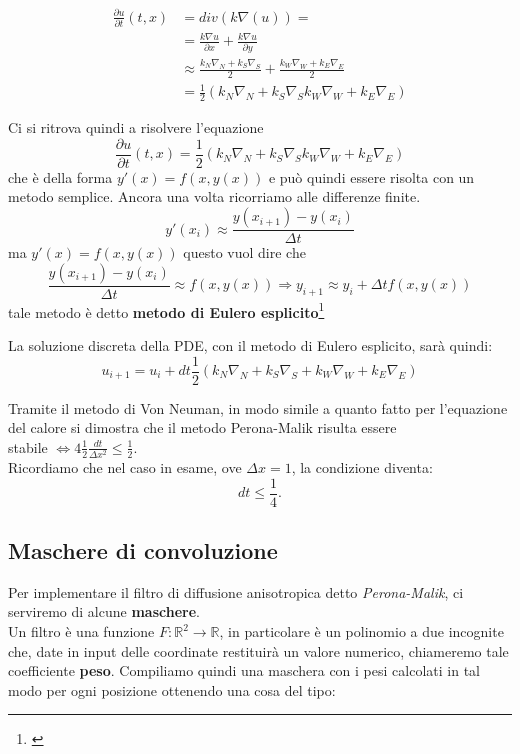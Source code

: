 \begin{align*}
    \frac{\partial u}{\partial t}(t,x)&=div(k\nabla(u))=\\
    &=\frac{k\nabla u}{\partial x} +\frac{k\nabla u}{\partial y}\\
    &\approx\frac{k_N\nabla_N + k_S\nabla_S}{2} +\frac{k_W\nabla_W + k_E\nabla_E}{2}\\
    &=\frac{1}{2}(k_N\nabla_N + k_S\nabla_S k_W\nabla_W + k_E\nabla_E) 
\end{align*}


Ci si ritrova quindi a risolvere l'equazione 
$$
\frac{\partial u}{\partial t}(t,x)=\frac{1}{2}(k_N\nabla_N + k_S\nabla_S k_W\nabla_W + k_E\nabla_E) 
$$
che è della forma $y'(x)=f(x,y(x))$ e può quindi essere risolta con un metodo semplice.
Ancora una volta ricorriamo alle differenze finite.
$$
y'(x_i)\approx \frac{y(x_{i+1})-y(x_{i})}{\Delta t} 
$$
ma $y'(x)=f(x,y(x))$ questo vuol dire che
$$
\frac{y(x_{i+1})-y(x_{i})}{\Delta t}\approx f(x,y(x)) \Rightarrow y_{i+1} \approx y_{i} + \Delta t f(x,y(x))
$$
tale metodo è detto \textbf{metodo di Eulero esplicito}\footnote{\cite{monegato}}

La soluzione discreta della PDE, con il metodo di Eulero esplicito, sarà quindi:\\

$$
u_{i+1} = u_i + dt\frac{1}{2}(k_N\nabla_N + k_S\nabla_S + k_W\nabla_W + k_E\nabla_E)
$$

\begin{osservazione}
Tramite il metodo di Von Neuman, in modo simile a quanto fatto per l'equazione del calore si
dimostra che il metodo Perona-Malik risulta essere\\
\vspace{0.25em}
stabile $\Longleftrightarrow 4\frac{1}{2}\frac{dt}{\Delta x^2}\leq\frac{1}{2}$.\\
\vspace{0.25em}
Ricordiamo che nel caso in esame, ove $\Delta x=1$, la condizione diventa:
$$
dt\leq \frac{1}{4}.
$$
\end{osservazione}


\subsection{Maschere di convoluzione}
Per implementare il filtro di diffusione anisotropica detto \textit{Perona-Malik}, ci serviremo di alcune \textbf{maschere}.\\
Un filtro è una funzione $F:\mathbb R^2\to\mathbb R$,
in particolare è un polinomio a due incognite che, date in input delle coordinate restituirà un valore numerico, chiameremo tale coefficiente \textbf{peso}. Compiliamo quindi una maschera con i pesi calcolati in tal modo per ogni posizione ottenendo una cosa del tipo:

